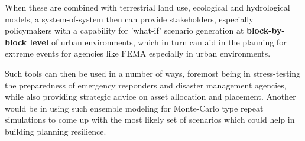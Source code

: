 When these are combined with terrestrial land use, ecological and
hydrological models, a system-of-system then can provide stakeholders,
especially policymakers with a capability for 'what-if' scenario
generation at \textbf{block-by-block level} of urban environments,
which in turn can aid in the planning for extreme events for agencies
like FEMA especially in urban environments. 

Such tools can then be used in a number of ways, foremost being in
stress-testing the preparedness of emergency responders and disaster
management agencies, while also providing strategic advice on asset
allocation and placement. Another would be in using such ensemble
modeling for Monte-Carlo type repeat simulations to come up with the
most likely set of scenarios which could help in building planning
resilience.
